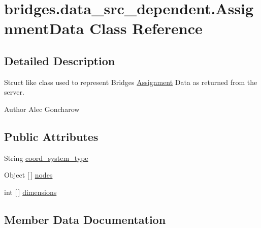 \hypertarget{classbridges_1_1data__src__dependent_1_1_assignment_data}{}\section{bridges.\+data\+\_\+src\+\_\+dependent.\+Assignment\+Data Class Reference}
\label{classbridges_1_1data__src__dependent_1_1_assignment_data}


\subsection{Detailed Description}
Struct like class used to represent Bridges \mbox{\hyperlink{classbridges_1_1data__src__dependent_1_1_assignment}{Assignment}} Data as returned from the server. 

\begin{DoxyAuthor}{Author}
Alec Goncharow 
\end{DoxyAuthor}
\subsection*{Public Attributes}
\begin{DoxyCompactItemize}
\item 
String \mbox{\hyperlink{classbridges_1_1data__src__dependent_1_1_assignment_data_a6734aba0f017aca0024fcd80905be4f4}{coord\+\_\+system\+\_\+type}}
\item 
Object \mbox{[}$\,$\mbox{]} \mbox{\hyperlink{classbridges_1_1data__src__dependent_1_1_assignment_data_a1d7c23816a57cf9b3bd1bc0b53f15e8e}{nodes}}
\item 
int \mbox{[}$\,$\mbox{]} \mbox{\hyperlink{classbridges_1_1data__src__dependent_1_1_assignment_data_ab4aa179a24395748542f6fb64307132c}{dimensions}}
\end{DoxyCompactItemize}


\subsection{Member Data Documentation}
\mbox{\label{classbridges_1_1data__src__dependent_1_1_assignment_data_a6734aba0f017aca0024fcd80905be4f4}} 
